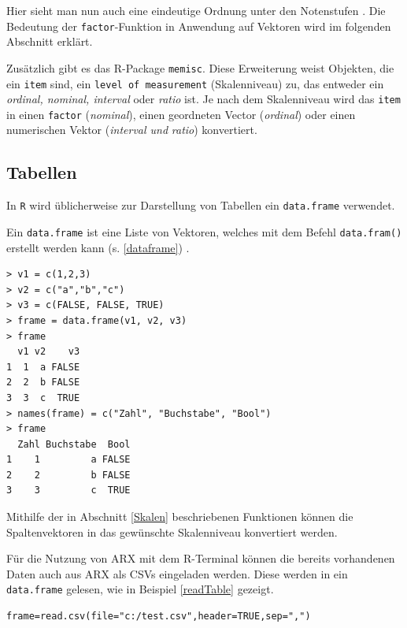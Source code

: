 \documentclass[a4paper, 12pt]{report} %
\begin{document}
Hier sieht man nun auch eine eindeutige Ordnung unter den Notenstufen \cite{factorVariables}. Die Bedeutung der \texttt{factor}-Funktion in Anwendung auf Vektoren wird im folgenden Abschnitt erklärt. 

Zusätzlich gibt es das R-Package \texttt{memisc}. Diese Erweiterung weist Objekten, die ein \texttt{item} sind, ein \texttt{level of measurement} (Skalenniveau) zu, das entweder ein \textit{ordinal, nominal, interval} oder \textit{ratio} ist. Je nach dem Skalenniveau wird das \texttt{item} in einen \texttt{factor} (\textit{nominal}), einen geordneten Vector (\textit{ordinal}) oder einen numerischen Vektor (\textit{interval und} \textit{ratio}) konvertiert. 

\subsection{Tabellen}

In \texttt{R} wird üblicherweise zur Darstellung von Tabellen ein \texttt{data.frame} verwendet. 

Ein \texttt{data.frame} ist eine Liste von Vektoren, welches mit dem Befehl \texttt{data.fram()} erstellt werden kann (s. \ref{dataframe}) \cite{dataFrame}.

\lstset{language=R}
\begin{lstlisting}[frame=single,caption={\texttt{data.frame} aus 3 Vektoren}]
> v1 = c(1,2,3)
> v2 = c("a","b","c")
> v3 = c(FALSE, FALSE, TRUE)
> frame = data.frame(v1, v2, v3)
> frame
  v1 v2    v3
1  1  a FALSE
2  2  b FALSE
3  3  c  TRUE
> names(frame) = c("Zahl", "Buchstabe", "Bool")
> frame
  Zahl Buchstabe  Bool
1    1         a FALSE
2    2         b FALSE
3    3         c  TRUE

\end{lstlisting}
\label{dataframe}

Mithilfe der in Abschnitt \ref{Skalen} beschriebenen Funktionen können die Spaltenvektoren in das gewünschte Skalenniveau konvertiert werden.
 
Für die Nutzung von ARX mit dem R-Terminal können die bereits vorhandenen Daten auch aus ARX als CSVs eingeladen werden. 
Diese werden in ein \texttt{data.frame} gelesen, wie in Beispiel \ref{readTable} gezeigt.

\lstset{language=R}
\begin{lstlisting}[frame=single,caption={Einlesen einer Tabelle}]
frame=read.csv(file="c:/test.csv",header=TRUE,sep=",")
\end{lstlisting}
\label{readTable}
\end{document}
